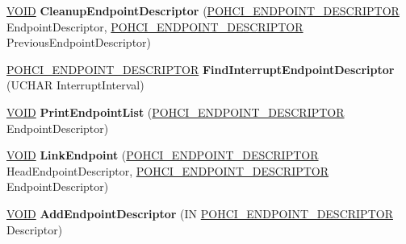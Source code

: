 \begin{DoxyCompactItemize}
\item 
\mbox{\label{class_c_u_s_b_queue_aec7eac0d914a5a65847a058664929d52}} 
\hyperlink{interfacevoid}{V\+O\+ID} {\bfseries Cleanup\+Endpoint\+Descriptor} (\hyperlink{struct___o_h_c_i___e_n_d_p_o_i_n_t___d_e_s_c_r_i_p_t_o_r}{P\+O\+H\+C\+I\+\_\+\+E\+N\+D\+P\+O\+I\+N\+T\+\_\+\+D\+E\+S\+C\+R\+I\+P\+T\+OR} Endpoint\+Descriptor, \hyperlink{struct___o_h_c_i___e_n_d_p_o_i_n_t___d_e_s_c_r_i_p_t_o_r}{P\+O\+H\+C\+I\+\_\+\+E\+N\+D\+P\+O\+I\+N\+T\+\_\+\+D\+E\+S\+C\+R\+I\+P\+T\+OR} Previous\+Endpoint\+Descriptor)
\item 
\mbox{\label{class_c_u_s_b_queue_a4bf56486451893a118fdb0adcec29e21}} 
\hyperlink{struct___o_h_c_i___e_n_d_p_o_i_n_t___d_e_s_c_r_i_p_t_o_r}{P\+O\+H\+C\+I\+\_\+\+E\+N\+D\+P\+O\+I\+N\+T\+\_\+\+D\+E\+S\+C\+R\+I\+P\+T\+OR} {\bfseries Find\+Interrupt\+Endpoint\+Descriptor} (U\+C\+H\+AR Interrupt\+Interval)
\item 
\mbox{\label{class_c_u_s_b_queue_ae7f4a116da1aa72bfa49fe4ed0683b29}} 
\hyperlink{interfacevoid}{V\+O\+ID} {\bfseries Print\+Endpoint\+List} (\hyperlink{struct___o_h_c_i___e_n_d_p_o_i_n_t___d_e_s_c_r_i_p_t_o_r}{P\+O\+H\+C\+I\+\_\+\+E\+N\+D\+P\+O\+I\+N\+T\+\_\+\+D\+E\+S\+C\+R\+I\+P\+T\+OR} Endpoint\+Descriptor)
\item 
\mbox{\label{class_c_u_s_b_queue_a50f08ba555f25dfbc4fc8f9c295d4a7e}} 
\hyperlink{interfacevoid}{V\+O\+ID} {\bfseries Link\+Endpoint} (\hyperlink{struct___o_h_c_i___e_n_d_p_o_i_n_t___d_e_s_c_r_i_p_t_o_r}{P\+O\+H\+C\+I\+\_\+\+E\+N\+D\+P\+O\+I\+N\+T\+\_\+\+D\+E\+S\+C\+R\+I\+P\+T\+OR} Head\+Endpoint\+Descriptor, \hyperlink{struct___o_h_c_i___e_n_d_p_o_i_n_t___d_e_s_c_r_i_p_t_o_r}{P\+O\+H\+C\+I\+\_\+\+E\+N\+D\+P\+O\+I\+N\+T\+\_\+\+D\+E\+S\+C\+R\+I\+P\+T\+OR} Endpoint\+Descriptor)
\item 
\mbox{\label{class_c_u_s_b_queue_a6c9972be7bbd8c8e70681565191bf9dc}} 
\hyperlink{interfacevoid}{V\+O\+ID} {\bfseries Add\+Endpoint\+Descriptor} (IN \hyperlink{struct___o_h_c_i___e_n_d_p_o_i_n_t___d_e_s_c_r_i_p_t_o_r}{P\+O\+H\+C\+I\+\_\+\+E\+N\+D\+P\+O\+I\+N\+T\+\_\+\+D\+E\+S\+C\+R\+I\+P\+T\+OR} Descriptor)
\item 
\mbox{\label{class_c_u_s_b_queue_aae24f6667a154d998489c7420db869d2}} 

\end{DoxyCompactItemize}
